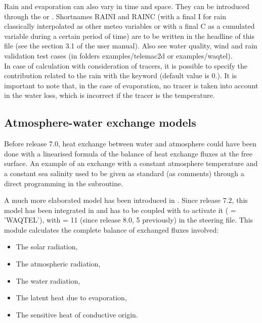 Rain and evaporation can also vary in time and space.
They can be introduced through the 
or .
Shortnames RAINI and RAINC (with a final I for rain classically interpolated as
other meteo variables or with a final C as a cumulated variable during a certain
period of time) are to be written in the headline of this file (see the section
3.1 of the \waqtel user manual).
Also see water quality, wind and rain validation test cases (in folders
examples/telemac2d or examples/waqtel).\\

In case of calculation with consideration of tracers, it is possible to specify
the contribution related to the rain with the keyword  (default value is 0.). It is important to note that, in the case
of evaporation, no tracer is taken into account in the water loss, which is
incorrect if the tracer is the temperature.

\subsection{Atmosphere-water exchange models}

Before release 7.0, heat exchange between water and atmosphere could have been
done with a linearised formula of the balance of heat exchange fluxes at the
free surface. An example of an exchange with a constant atmosphere temperature
and a constant sea salinity used to be given as standard (as comments) through a
direct programming in the  subroutine.

A much more elaborated model has been introduced in .
Since release 7.2, this model has been integrated in \waqtel and
 has to be coupled with \waqtel to activate it
( = 'WAQTEL'), with
 = 11 (since release 8.0, 5 previously)
in the \waqtel steering file.
This module calculates the complete balance of exchanged fluxes involved:

\begin{itemize}
\item  The solar radiation,

\item  The atmospheric radiation,

\item  The water radiation,

\item  The latent heat due to evaporation,

\item  The sensitive heat of conductive origin.
\end{itemize}

